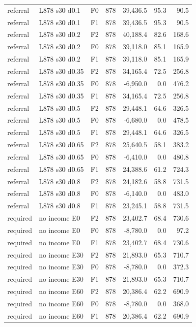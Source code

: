 \begin{longtable}{p{1.8cm}p{3.35cm}lrrrr}
referral & L878 s30 d0.1 & F0 & 878 & 39,436.5 & 95.3 & 90.5\\
referral & L878 s30 d0.1 & F1 & 878 & 39,436.5 & 95.3 & 90.5\\
referral & L878 s30 d0.2 & F2 & 878 & 40,188.4 & 82.6 & 168.6\\
referral & L878 s30 d0.2 & F0 & 878 & 39,118.0 & 85.1 & 165.9\\
referral & L878 s30 d0.2 & F1 & 878 & 39,118.0 & 85.1 & 165.9\\
referral & L878 s30 d0.35 & F2 & 878 & 34,165.4 & 72.5 & 256.8\\
referral & L878 s30 d0.35 & F0 & 878 & -6,950.0 & 0.0 & 476.2\\
referral & L878 s30 d0.35 & F1 & 878 & 34,165.4 & 72.5 & 256.8\\
referral & L878 s30 d0.5 & F2 & 878 & 29,448.1 & 64.6 & 326.5\\
referral & L878 s30 d0.5 & F0 & 878 & -6,680.0 & 0.0 & 478.5\\
referral & L878 s30 d0.5 & F1 & 878 & 29,448.1 & 64.6 & 326.5\\
referral & L878 s30 d0.65 & F2 & 878 & 25,640.5 & 58.1 & 383.2\\
referral & L878 s30 d0.65 & F0 & 878 & -6,410.0 & 0.0 & 480.8\\
referral & L878 s30 d0.65 & F1 & 878 & 24,388.6 & 61.2 & 724.3\\
referral & L878 s30 d0.8 & F2 & 878 & 24,182.6 & 58.8 & 731.5\\
referral & L878 s30 d0.8 & F0 & 878 & -6,140.0 & 0.0 & 483.0\\
referral & L878 s30 d0.8 & F1 & 878 & 23,245.1 & 58.8 & 731.5\\
required & no income E0 & F2 & 878 & 23,402.7 & 68.4 & 730.6\\
required & no income E0 & F0 & 878 & -8,780.0 & 0.0 & 97.2\\
required & no income E0 & F1 & 878 & 23,402.7 & 68.4 & 730.6\\
required & no income E30 & F2 & 878 & 21,893.0 & 65.3 & 710.7\\
required & no income E30 & F0 & 878 & -8,780.0 & 0.0 & 372.3\\
required & no income E30 & F1 & 878 & 21,893.0 & 65.3 & 710.7\\
required & no income E60 & F2 & 878 & 20,386.4 & 62.2 & 690.9\\
required & no income E60 & F0 & 878 & -8,780.0 & 0.0 & 368.0\\
required & no income E60 & F1 & 878 & 20,386.4 & 62.2 & 690.9\\

\end{longtable}
